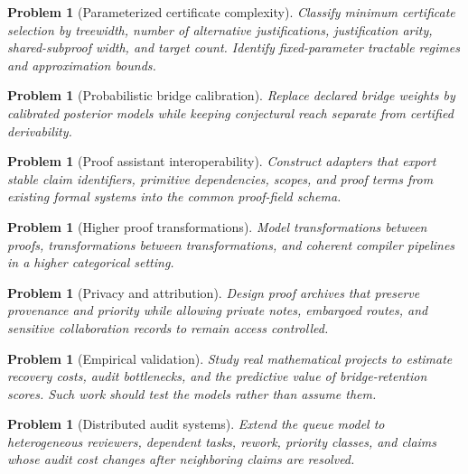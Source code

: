 \documentclass[11pt,oneside]{article}
\theoremstyle{komorebiplain}
\theoremstyle{komorebidefinition}
\newtheorem{problem}[theorem]{Problem}
\theoremstyle{komorebiremark}
\begin{document}
\begin{problem}[Parameterized certificate complexity]
\label{res:28:5}
Classify minimum certificate selection by treewidth, number of alternative justifications, justification arity, shared-subproof width, and target count. Identify fixed-parameter tractable regimes and approximation bounds.
\end{problem}

\begin{problem}[Probabilistic bridge calibration]
\label{res:28:6}
Replace declared bridge weights by calibrated posterior models while keeping conjectural reach separate from certified derivability.
\end{problem}

\begin{problem}[Proof assistant interoperability]
\label{res:28:7}
Construct adapters that export stable claim identifiers, primitive dependencies, scopes, and proof terms from existing formal systems into the common proof-field schema.
\end{problem}

\begin{problem}[Higher proof transformations]
\label{res:28:8}
Model transformations between proofs, transformations between transformations, and coherent compiler pipelines in a higher categorical setting.
\end{problem}

\begin{problem}[Privacy and attribution]
\label{res:28:9}
Design proof archives that preserve provenance and priority while allowing private notes, embargoed routes, and sensitive collaboration records to remain access controlled.
\end{problem}

\begin{problem}[Empirical validation]
\label{res:28:10}
Study real mathematical projects to estimate recovery costs, audit bottlenecks, and the predictive value of bridge-retention scores. Such work should test the models rather than assume them.
\end{problem}

\begin{problem}[Distributed audit systems]
\label{res:28:11}
Extend the queue model to heterogeneous reviewers, dependent tasks, rework, priority classes, and claims whose audit cost changes after neighboring claims are resolved.
\end{problem}


\clearpage
\end{document}
